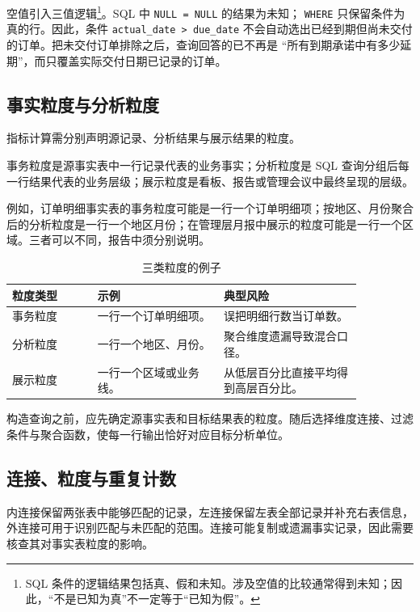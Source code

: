 空值引入三值逻辑\footnote{SQL 条件的逻辑结果包括真、假和未知。涉及空值的比较通常得到未知；因此，“不是已知为真”不一定等于“已知为假”。}。SQL 中 \texttt{NULL = NULL} 的结果为未知；
\texttt{WHERE} 只保留条件为真的行。因此，条件 \texttt{actual\_date > due\_date}
不会自动选出已经到期但尚未交付的订单。把未交付订单排除之后，查询回答的已不再是
“所有到期承诺中有多少延期”，而只覆盖实际交付日期已记录的订单。

\subsection{事实粒度与分析粒度}

指标计算需分别声明源记录、分析结果与展示结果的粒度。

\begin{definition}
事务粒度是源事实表中一行记录代表的业务事实；分析粒度是 SQL 查询分组后每一行结果代表的业务层级；展示粒度是看板、报告或管理会议中最终呈现的层级。
\end{definition}

例如，订单明细事实表的事务粒度可能是一行一个订单明细项；按地区、月份聚合后的分析粒度是一行一个地区月份；在管理层月报中展示的粒度可能是一行一个区域。三者可以不同，报告中须分别说明。

\begin{table}[htbp]
\centering
\caption{三类粒度的例子}
\begin{tabular}{P{0.21\linewidth}P{0.31\linewidth}P{0.34\linewidth}}
\toprule
{}
粒度类型 & 示例 & 典型风险\\
\midrule
事务粒度 & 一行一个订单明细项。 & 误把明细行数当订单数。\\
分析粒度 & 一行一个地区、月份。 & 聚合维度遗漏导致混合口径。\\
展示粒度 & 一行一个区域或业务线。 & 从低层百分比直接平均得到高层百分比。\\
\bottomrule
\end{tabular}
\end{table}

构造查询之前，应先确定源事实表和目标结果表的粒度。随后选择维度连接、过滤条件与聚合函数，使每一行输出恰好对应目标分析单位。

\subsection{连接、粒度与重复计数}

内连接保留两张表中能够匹配的记录，左连接保留左表全部记录并补充右表信息，外连接可用于识别匹配与未匹配的范围。连接可能复制或遗漏事实记录，因此需要核查其对事实表粒度的影响。

